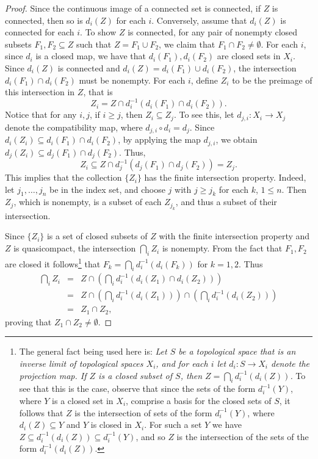 \documentclass[preprint, 11pt,nonatbib]{elsarticle}
\theoremstyle{definition}
\numberwithin{theorem}{section}
\begin{document}
\begin{proof}
Since the continuous image of a connected set is connected, if $Z$ is connected, then so is $d_i (Z)$ for each $i$.
Conversely, assume that $d_i ({Z})$ is connected for each $i$.
To show $Z$ is connected, for any pair of nonempty closed subsets $F_1, F_2 \subseteq Z$ such that $Z = F_1 \cup F_2$, we claim that $F_1 \cap F_2 \ne \emptyset$.
For each $i$, since $d_i$ is a closed map, we have that $d_i (F_1), d_i (F_2)$ are closed sets in $X_i$.
Since $d_i ({Z})$ is connected and $d_i ({Z}) = d_i (F_1) \cup d_i (F_2)$, the intersection $d_i (F_1) \cap d_i (F_2)$ must be nonempty.
For each $i$, define $Z_i$ to be the preimage of this intersection in $Z$, that is
    $$Z_i = Z \cap  d_i^{-1} (d_i (F_1) \cap d_i (F_2)).$$
Notice that for any $i, j$, if $i \ge j$, then $Z_i \subseteq Z_j$.
To see this, let $d_{j, i} : X_i \rightarrow X_j$ denote the compatibility map, where $d_{j, i} \circ d_i = d_j$.
Since $d_i (Z_i) \subseteq d_i (F_1) \cap d_i (F_2)$, by applying the map $d_{j, i}$, we obtain $d_j (Z_i) \subseteq d_j (F_1) \cap d_j (F_2)$.
Thus,
    $$Z_i \subseteq Z \cap d^{-1}_j (d_j (F_1) \cap d_j (F_2)) = Z_j.$$
This implies that the collection $\{ Z_i \}$ has the finite intersection property.
Indeed, let $j_1, \ldots, j_n$ be in the index set, and choose $j$ with $j \ge j_k$ for each $k$, $1 \le n$.
Then $Z_j$, which is nonempty, is a subset of each $Z_{j_k}$, and thus a subset of their intersection.

Since $\{ Z_i \}$ is a set of closed subsets of $Z$ with the finite intersection property and $Z$ is quasicompact, the intersection $\bigcap_{i} Z_i$ is nonempty. 
From the fact that $F_1, F_2$ are closed it follows\footnote{The general fact being used here is:
{\it
    Let $S$ be a topological space  that is an inverse limit of topological spaces $X_i$, and for each $i$ let $d_i: S \rightarrow X_i$ denote the projection map.
    If $Z$ is a closed subset of $S$, then $Z = \bigcap_{i} d_i^{-1}(d_i(Z))$.
}
To see that this is the case, observe that since the sets of the form $d_i^{-1} (Y)$, where $Y$ is a closed set in $X_i$, comprise a basis for the closed sets of $S$, it follows that $Z$ is the intersection of sets of the form $d_i^{-1}(Y)$, where $d_i(Z) \subseteq Y$ and $Y$ is closed in $X_i$. 
For such a set $Y$ we have $Z \subseteq d^{-1}_i(d_i(Z)) \subseteq d_i^{-1}(Y)$, and so $Z$ is the intersection of the sets of the form $d_i^{-1}(d_i(Z))$. 
 }
that $F_k =\bigcap_{i} d_i^{-1} (d_i (F_k))$ for $k = 1, 2$.
Thus 
\begin{eqnarray*} 
    \bigcap_i Z_i 
        &= & Z \cap \left( \bigcap_i d_i^{-1}(d_i(Z_1) \cap d_i(Z_2))\right) \\
        &= & Z \cap \left( \bigcap_i  d_i^{-1}(d_i(Z_1))\right) \cap \left( \bigcap_i d_i^{-1}( d_i(Z_2))\right) \\ 
        &= & Z_1 \cap Z_2,
\end{eqnarray*}
proving that $Z_1 \cap Z_2 \ne \emptyset$.
\end{proof}
 
\end{document}
